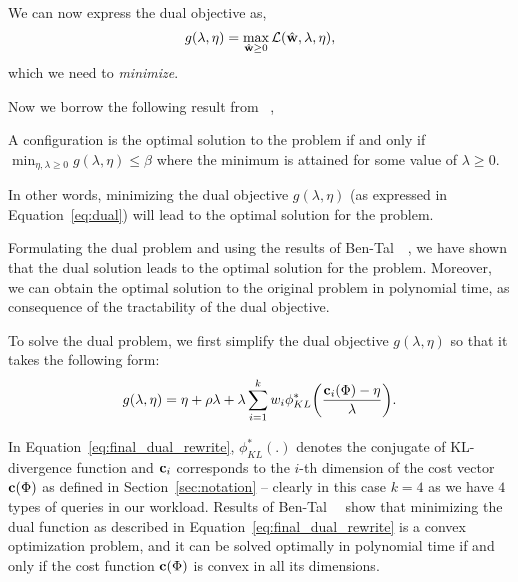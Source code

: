 We can now express the dual objective as,
\begin{equation}\label{eq:dual}
    g(\lambda, \eta) = \max_{{{\hat{\bf{w}}}} \geq 0}\mathcal{L}({{\hat{\bf{w}}}},
    \lambda, \eta),
\end{equation}
which we need to \emph{minimize}.

Now we borrow the following result from ~\cite{Ben-Tal2013-kw},
\begin{lemma}
A configuration {\configuration} is the optimal solution to the {\robustw} problem
if and only if $\min_{\eta, \lambda \geq
    0}g(\lambda, \eta) \leq \beta$ where the minimum is attained for some value of
    $\lambda \geq 0$.
\end{lemma}
In other words, minimizing the dual objective $g(\lambda, \eta)$ (as expressed
    in Equation~\eqref{eq:dual}) will lead to the optimal solution for the
    {\robustw} problem. 

 Formulating the 
dual problem and using the results of 
Ben-Tal~\etal~\cite{Ben-Tal2013-kw}, we have shown that the dual solution 
leads to the optimal solution for the {\robustw} problem.
Moreover, we can obtain the optimal solution
    to the original {\robustw} problem in polynomial time, as consequence of the
    tractability of the dual objective. 

To solve the dual problem, we first simplify the dual objective
$g(\lambda,\eta)$ so that it takes the following form:
\begin{equation}\label{eq:final_dual_rewrite}
 g(\lambda,\eta) = \eta + \rho \lambda + \lambda
    \sum_{i=1}^{k}w_i\phi_{KL}^* \bigg(\frac{{{\bf{c}}}_i({{\Phi}}) - \eta}{\lambda}\bigg).
\end{equation}

In Equation~\eqref{eq:final_dual_rewrite}, $\phi_{KL}^*(.)$ denotes the conjugate of KL-divergence function
and ${{\bf{c}}}_i$ corresponds to the $i$-th dimension of the cost vector ${{\bf{c}}}({{\Phi}})$ as defined in
Section~\ref{sec:notation} -- clearly in this case $k=4$ as we have $4$ types of queries in our workload.
Results of Ben-Tal~\etal~\cite{Ben-Tal2013-kw} show that 
minimizing the dual function as described in Equation~\eqref{eq:final_dual_rewrite} is a convex optimization problem,
and it can be solved optimally in polynomial time if and only if the cost function ${{\bf{c}}}({{\Phi}})$
is convex in all its dimensions.

